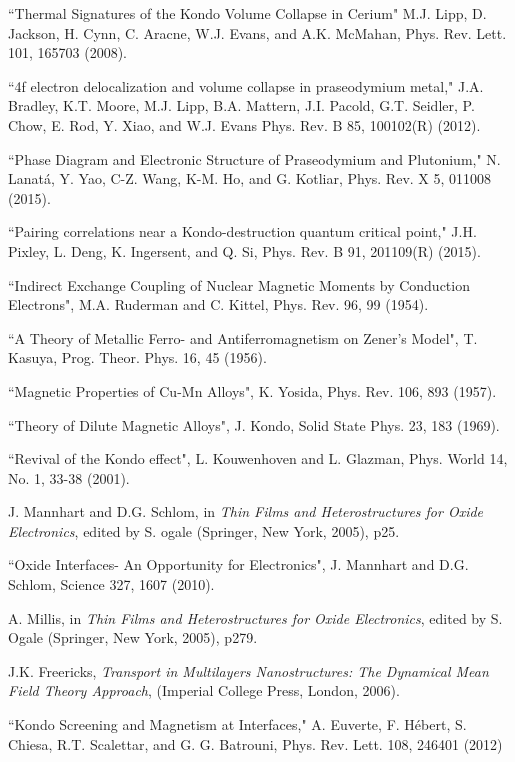 \documentclass[pra,letterpaper,10pt,twocolumn]{revtex4}
\begin{document}
\begin{thebibliography}{100}
``Thermal Signatures of the Kondo Volume Collapse in Cerium"
M.J. Lipp, D. Jackson, H. Cynn, C. Aracne, W.J. Evans, and A.K. McMahan,
Phys. Rev. Lett. 101, 165703 (2008).

``4f electron delocalization and volume collapse in praseodymium
metal,"
J.A. Bradley, K.T. Moore, M.J. Lipp, B.A. Mattern,
J.I. Pacold, G.T. Seidler, P. Chow, E. Rod, Y. Xiao,
and W.J. Evans
Phys. Rev. B 85, 100102(R) (2012).

``Phase Diagram and Electronic Structure of Praseodymium and Plutonium,"
N. Lanat\'a, Y. Yao, C-Z. Wang, K-M. Ho, and G. Kotliar,
Phys. Rev. X 5, 011008 (2015).

``Pairing correlations near a Kondo-destruction quantum critical
point,"
J.H. Pixley, L. Deng, K. Ingersent, and Q. Si,
Phys. Rev. B 91, 201109(R) (2015).

``Indirect Exchange Coupling of Nuclear Magnetic Moments by Conduction Electrons",
M.A. Ruderman and C. Kittel, Phys. Rev. 96, 99 (1954).

``A Theory of Metallic Ferro- and Antiferromagnetism on Zener's Model",
T. Kasuya, Prog. Theor. Phys. 16, 45 (1956).

``Magnetic Properties of Cu-Mn Alloys",
K. Yosida, Phys. Rev. 106, 893 (1957).

``Theory of Dilute Magnetic Alloys",
J. Kondo, Solid State Phys. 23, 183 (1969).

``Revival of the Kondo effect",
L. Kouwenhoven and L. Glazman, Phys. World 14, No. 1, 33-38 (2001).

J. Mannhart and D.G. Schlom,
in {\it Thin Films and Heterostructures for
Oxide Electronics}, edited by S. ogale
(Springer, New York, 2005), p25.

``Oxide Interfaces-  An Opportunity for Electronics",
J. Mannhart and D.G. Schlom,
Science 327, 1607 (2010).

A. Millis, in {\it Thin Films and Heterostructures for
Oxide Electronics}, edited by S. Ogale
(Springer, New York, 2005), p279.

J.K. Freericks, {\it Transport in Multilayers Nanostructures:
The Dynamical Mean Field Theory Approach},
(Imperial College Press, London, 2006).

``Kondo Screening and Magnetism at Interfaces,"
A. Euverte, F. H\'ebert, S. Chiesa, R.T. Scalettar, 
and G. G. Batrouni, Phys. Rev. Lett. 108, 246401 (2012)


\end{thebibliography}
\end{document}
